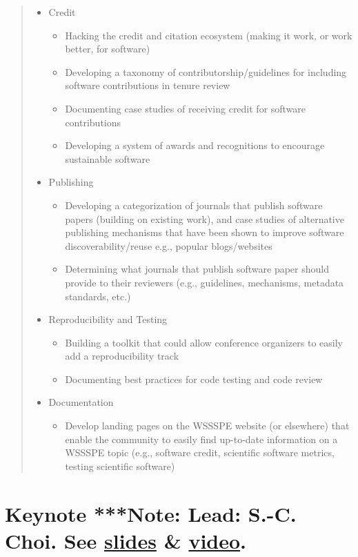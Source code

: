 \documentclass[11pt, oneside]{amsart}
\newcommand{\note}[1]{ {\textcolor{blueish}    { ***Note:      #1 }}}
\begin{document}
\begin{quote}
\begin{itemize}
\item Credit
\begin{itemize}
\item Hacking the credit and citation ecosystem (making it work, or work better,
for software)
\item Developing a taxonomy of contributorship/guidelines for including software
contributions in tenure review
\item Documenting case studies of receiving credit for software contributions
\item Developing a system of awards and recognitions to encourage sustainable software
\end{itemize}

\item Publishing
\begin{itemize}
\item Developing a categorization of journals that publish software papers
(building on existing work), and case studies of alternative publishing
mechanisms that have been shown to improve software discoverability/reuse e.g.,
popular blogs/websites
\item Determining what journals that publish software paper should provide to
their reviewers (e.g., guidelines, mechanisms, metadata standards, etc.)
\end{itemize}

\item Reproducibility and Testing
\begin{itemize}
\item Building a toolkit that could allow conference organizers to easily add a
reproducibility track
\item Documenting best practices for code testing and code review
\end{itemize}

\item Documentation
\begin{itemize}
\item Develop landing pages on the WSSSPE website (or elsewhere) that enable the
community to easily find up-to-date information on a WSSSPE topic (e.g.,
software credit, scientific software metrics, testing scientific software)
\end{itemize}

\end{itemize}
\end{quote}

\section{Keynote \note{Lead: S.-C. Choi.  See \href{http://tinyurl.com/qbbqgsj}{slides} \& \href{http://tinyurl.com/q45kfcn}{video}.}} \label{sec:keynote} 
\end{document}
